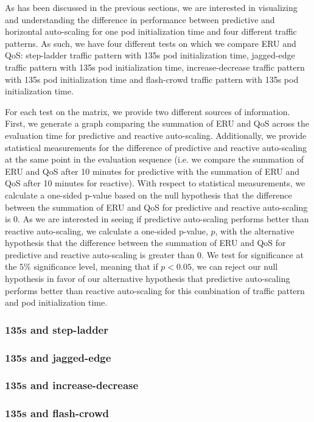As has been discussed in the previous sections, we are interested in visualizing
and understanding the difference in performance between predictive and
horizontal auto-scaling for one pod initialization time and four
different traffic patterns. As such, we have four different tests on which we
compare ERU and QoS: step-ladder traffic pattern with 135s pod initialization
time, jagged-edge traffic pattern with 135s pod initialization time,
increase-decrease traffic pattern with 135s pod
initialization time and flash-crowd traffic pattern with 135s pod initialization time.

For each test on the matrix, we provide two different sources of information.
First, we generate a graph comparing the summation of ERU and QoS across the
evaluation time for predictive and reactive auto-scaling. Additionally,
we provide statistical measurements for the difference of predictive and
reactive auto-scaling at the same point in the evaluation sequence (i.e. we
compare the summation of ERU and QoS after 10 minutes for predictive with the
summation of ERU and QoS after 10 minutes for reactive). With respect to
statistical measurements, we calculate a one-sided p-value
based on the null hypothesis that the difference
between the summation of ERU and QoS for predictive and reactive auto-scaling is
$0$. As we are interested in seeing if predictive auto-scaling performs better
than reactive auto-scaling, we calculate a one-sided p-value, $p$, with the alternative
hypothesis that the difference between the summation of ERU and QoS for
predictive and reactive auto-scaling is greater than $0$. We test for
significance at the $5\%$ significance level, meaning that if $p < 0.05$, we can
reject our null hypothesis in favor of our alternative hypothesis that
predictive auto-scaling performs better than reactive auto-scaling for this
combination of traffic pattern and pod initialization time.

\subsubsection{135s and step-ladder}



\subsubsection{135s and jagged-edge}



\subsubsection{135s and increase-decrease}



\subsubsection{135s and flash-crowd}


